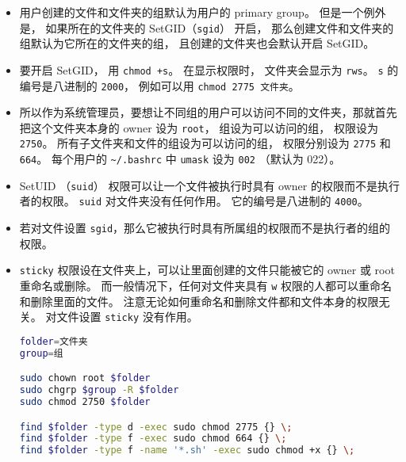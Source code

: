 \begin{itemize}
\item 用户创建的文件和文件夹的组默认为用户的 primary group。 但是一个例外是， 如果所在的文件夹的 SetGID（\verb|sgid|） 开启， 那么创建文件和文件夹的组默认为它所在的文件夹的组， 且创建的文件夹也会默认开启 SetGID。
\item 要开启 SetGID， 用 \verb|chmod +s|。 在显示权限时， 文件夹会显示为 \verb|rws|。 \verb|s| 的编号是八进制的 \verb|2000|， 例如可以用 \verb|chmod 2775 文件夹|。
\item 所以作为系统管理员，要想让不同组的用户可以访问不同的文件夹，那就首先把这个文件夹本身的 owner 设为 \verb|root|， 组设为可以访问的组， 权限设为 \verb|2750|。 所有子文件夹和文件的组设为可以访问的组， 权限分别设为 \verb|2775| 和 \verb|664|。 每个用户的 \verb|~/.bashrc| 中 \verb|umask| 设为 \verb|002| （默认为 022）。
\item SetUID （\verb|suid|） 权限可以让一个文件被执行时具有 owner 的权限而不是执行者的权限。 \verb|suid| 对文件夹没有任何作用。 它的编号是八进制的 \verb|4000|。
\item 若对文件设置 \verb|sgid|，那么它被执行时具有所属组的权限而不是执行者的组的权限。
\item \verb|sticky| 权限设在文件夹上，可以让里面创建的文件只能被它的 owner 或 root 重命名或删除。 而一般情况下，任何对文件夹具有 \verb|w| 权限的人都可以重命名和删除里面的文件。 注意无论如何重命名和删除文件都和文件本身的权限无关。 对文件设置 \verb|sticky| 没有作用。
\begin{lstlisting}[language=bash]
folder=文件夹
group=组

sudo chown root $folder
sudo chgrp $group -R $folder
sudo chmod 2750 $folder

find $folder -type d -exec sudo chmod 2775 {} \;
find $folder -type f -exec sudo chmod 664 {} \;
find $folder -type f -name '*.sh' -exec sudo chmod +x {} \;


\end{lstlisting}
\end{itemize}
